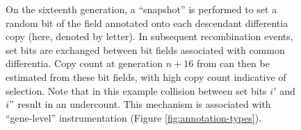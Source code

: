 \begin{figure}
\begin{minipage}{\textwidth}
{      On the sixteenth generation, a ``snapshot'' is performed to set a random bit of the field annotated onto each descendant differentia copy (here, denoted by letter).
      In subsequent recombination events, set bits are exchanged between bit fields associated with common differentia.
      Copy count at generation $n + 16$ from can then be estimated from these bit fields, with high copy count indicative of selection.
      Note that in this example collision between set bits $i'$ and $i"$ result in an undercount.
      This mechanism is associated with ``gene-level'' instrumentation (Figure \ref{fig:annotation-types}).
    }
    \label{fig:copy-count-snapshot}
  \end{minipage}

\end{figure}


%
%
%

